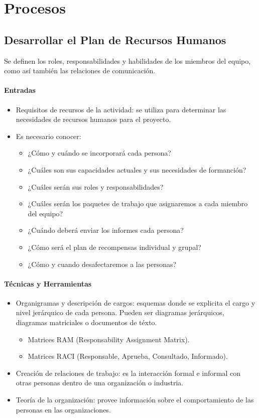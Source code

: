 \documentclass[a4paper,twosides]{article}
\newlength{\wideitemsep}
\let\olditem\item
\renewcommand{\item}{\setlength{\itemsep}{\wideitemsep}\olditem}
\begin{document}
\section*{Procesos}

\subsection{Desarrollar el Plan de Recursos Humanos} \label{sec:desarrollar_plan_rrhh}
Se definen los roles, responsabilidades y habilidades de los miembros del equipo, como así también las relaciones de comunicación.

\paragraph{Entradas}
\begin{itemize}
\item Requisitos de recursos de la actividad: se utiliza para determinar las necesidades de recursos humanos para el proyecto.
\item Es necesario conocer:
\begin{itemize}
\item ¿Cómo y cuándo se incorporará cada persona?
\item ¿Cuáles son sus capacidades actuales y sus necesidades de formanción?
\item ¿Cuáles serán sus roles y responsabilidades?
\item ¿Cuáles serán los paquetes de trabajo que asignaremos a cada miembro del equipo?
\item ¿Cuándo deberá enviar los informes cada persona?
\item ¿Cómo será el plan de recompensas individual y grupal?
\item ¿Cómo y cuando desafectaremos a las personas?
\end{itemize}
\end{itemize}

\paragraph{Técnicas y Herramientas}
\begin{itemize}
\item Organigramas y descripción de cargos: esquemas donde se explicita el cargo y nivel jerárquico de cada persona. Pueden ser diagramas jerárquicos, diagramas matriciales o documentos de téxto.
\begin{itemize}
\item Matrices RAM (Responsability Assignment Matrix).
\item Matrices RACI (Responsable, Aprueba, Consultado, Informado).
\end{itemize}
\item Creación de relaciones de trabajo: es la interacción formal e informal con otras personas dentro de una organización o industria.
\item Teoría de la organización: provee información sobre el comportamiento de las personas en las organizaciones.
\end{itemize}
\end{document}

